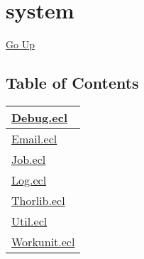 \chapter*{\color{headtoc} system}
\hypertarget{ecldoc:toc:root/system}{}
\hyperlink{ecldoc:toc:root}{Go Up}


\section*{Table of Contents}
{\renewcommand{\arraystretch}{1.5}
\begin{longtable}{|p{\textwidth}|}
\hline
\hyperlink{ecldoc:toc:system.Debug}{Debug.ecl} \\
\hline
\hyperlink{ecldoc:toc:system.Email}{Email.ecl} \\
\hline
\hyperlink{ecldoc:toc:system.Job}{Job.ecl} \\
\hline
\hyperlink{ecldoc:toc:system.Log}{Log.ecl} \\
\hline
\hyperlink{ecldoc:toc:system.Thorlib}{Thorlib.ecl} \\
\hline
\hyperlink{ecldoc:toc:system.Util}{Util.ecl} \\
\hline
\hyperlink{ecldoc:toc:system.Workunit}{Workunit.ecl} \\
\hline
\end{longtable}
}








